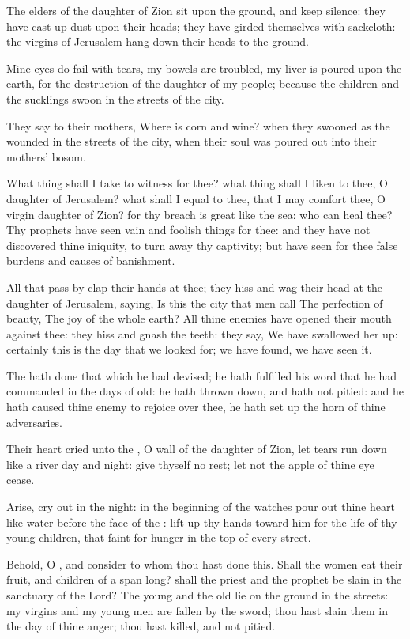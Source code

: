 \verse The elders of the daughter of Zion sit upon the ground, and keep silence: they have cast up dust upon their heads; they have girded themselves with sackcloth: the virgins of Jerusalem hang down their heads to the ground.

\verse Mine eyes do fail with tears, my bowels are troubled, my liver is poured upon the earth, for the destruction of the daughter of my people; because the children and the sucklings swoon in the streets of the city.

\verse They say to their mothers, Where is corn and wine? when they swooned as the wounded in the streets of the city, when their soul was poured out into their mothers' bosom.

\verse What thing shall I take to witness for thee? what thing shall I liken to thee, O daughter of Jerusalem? what shall I equal to thee, that I may comfort thee, O virgin daughter of Zion? for thy breach is great like the sea: who can heal thee?  \verse Thy prophets have seen vain and foolish things for thee: and they have not discovered thine iniquity, to turn away thy captivity; but have seen for thee false burdens and causes of banishment.

\verse All that pass by clap their hands at thee; they hiss and wag their head at the daughter of Jerusalem, saying, Is this the city that men call The perfection of beauty, The joy of the whole earth?  \verse All thine enemies have opened their mouth against thee: they hiss and gnash the teeth: they say, We have swallowed her up: certainly this is the day that we looked for; we have found, we have seen it.

\verse The \LORD hath done that which he had devised; he hath fulfilled his word that he had commanded in the days of old: he hath thrown down, and hath not pitied: and he hath caused thine enemy to rejoice over thee, he hath set up the horn of thine adversaries.

\verse Their heart cried unto the \LORD, O wall of the daughter of Zion, let tears run down like a river day and night: give thyself no rest; let not the apple of thine eye cease.

\verse Arise, cry out in the night: in the beginning of the watches pour out thine heart like water before the face of the \LORD: lift up thy hands toward him for the life of thy young children, that faint for hunger in the top of every street.

\verse Behold, O \LORD, and consider to whom thou hast done this. Shall the women eat their fruit, and children of a span long? shall the priest and the prophet be slain in the sanctuary of the Lord?  \verse The young and the old lie on the ground in the streets: my virgins and my young men are fallen by the sword; thou hast slain them in the day of thine anger; thou hast killed, and not pitied.

